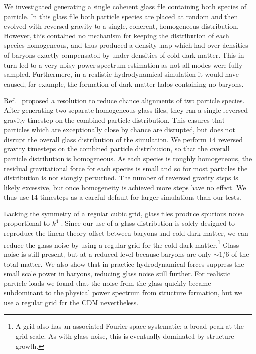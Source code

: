 \documentclass[a4paper,11pt]{article}
\begin{document}
We investigated generating a single coherent glass file containing both species of particle. In this glass file both particle species are placed at random and then evolved with reversed gravity to a single, coherent, homogeneous distribution. However, this contained no mechanism for keeping the distribution of each species homogeneous, and thus produced a density map which had over-densities of baryons exactly compensated by under-densities of cold dark matter. This in turn led to a very noisy power spectrum estimation as not all modes were fully sampled. Furthermore, in a realistic hydrodynamical simulation it would have caused, for example, the formation of dark matter halos containing no baryons.

Ref.~\cite{Yoshida:2003} proposed a resolution to reduce chance alignments of two particle species. After generating two separate homogeneous glass files, they ran a single reversed-gravity timestep on the combined particle distribution. This ensures that particles which are exceptionally close by chance are disrupted, but does not disrupt the overall glass distribution of the simulation. We perform $14$ reversed gravity timesteps on the combined particle distribution, so that the overall particle distribution is homogeneous. As each species is roughly homogeneous, the residual gravitational force for each species is small and so for most particles the distribution is not stongly perturbed. The number of reversed gravity steps is likely excessive, but once homogeneity is achieved more steps have no effect. We thus use $14$ timesteps as a careful default for larger simulations than our tests.

Lacking the symmetry of a regular cubic grid, glass files produce spurious noise proportional to $k^4$ \cite{Peebles:1993}. Since our use of a glass distribution is solely designed to reproduce the linear theory offset between baryons and cold dark matter, we can reduce the glass noise by using a regular grid for the cold dark matter.\footnote{A grid also has an associated Fourier-space systematic: a broad peak at the grid scale. As with glass noise, this is eventually dominated by structure growth.} Glass noise is still present, but at a reduced level because baryons are only $\sim 1/6$ of the total matter. We also show that in practice hydrodynamical forces suppress the small scale power in baryons, reducing glass noise still further. For realistic particle loads we found that the noise from the glass quickly became subdominant to the physical power spectrum from structure formation, but we use a regular grid for the CDM nevertheless.
\end{document}
